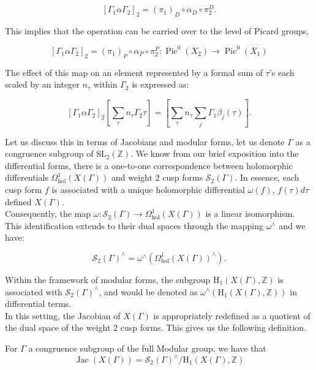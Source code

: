 \[
\left[\Gamma_{1} \alpha \Gamma_{2}\right]_{2} = (\pi_{1})_{D} \circ \alpha_{D} \circ \pi_{2}^{D}.
\]

This implies that the operation can be carried over to the level of Picard groups, 

\[
\left[\Gamma_{1} \alpha \Gamma_{2}\right]_{2} = (\pi_{1})_{P} \circ \alpha_{P} \circ \pi_{2}^{P}: \operatorname{Pic}^{0}(X_{2}) \longrightarrow \operatorname{Pic}^{0}(X_{1})
\]

The effect of this map on an element represented by a formal sum of \( \tau \)'s each scaled by an integer \( n_{\tau} \) within \( \Gamma_{2} \) is expressed as:

\[
\left[\Gamma_{1} \alpha \Gamma_{2}\right]_{2}\left[\sum_{\tau} n_{\tau} \Gamma_{2} \tau\right] = \left[\sum_{\tau} n_{\tau} \sum_{j} \Gamma_{1} \beta_{j}(\tau)\right].
\]

Let us discuss this in terms of Jacobians and modular forms, let us denote \( \Gamma \) as a congruence subgroup of \( \mathrm{SL}_{2}(\mathbb{Z}) \). We know from our brief exposition into the differential forms, there is a one-to-one correspondence between holomorphic differentials \( \Omega_{\mathrm{hol}}^{1}(X(\Gamma)) \) and weight 2 cusp forms \( \mathcal{S}_{2}(\Gamma) \). In essence, each cusp form \( f \) is associated with a unique holomorphic differential \( \omega(f) \), \( f(\tau) d \tau \) defined \( X(\Gamma) \). \\

Consequently, the map \( \omega: \mathcal{S}_{2}(\Gamma) \rightarrow \Omega_{\mathrm{hol}}^{1}(X(\Gamma)) \) is a linear isomorphism. This identification extends to their dual spaces through the mapping \( \omega^{\wedge} \) and we have: 

\[
\mathcal{S}_{2}(\Gamma)^{\wedge} = \omega^{\wedge}(\Omega_{\mathrm{hol}}^{1}(X(\Gamma))^{\wedge}).
\]

Within the framework of modular forms, the subgroup \( \mathrm{H}_{1}(X(\Gamma), \mathbb{Z}) \) is associated with \( \mathcal{S}_{2}(\Gamma)^{\wedge} \), and would be denoted as \( \omega^{\wedge}(\mathrm{H}_{1}(X(\Gamma), \mathbb{Z})) \) in differential terms. \\

In this setting, the Jacobian of \( X(\Gamma) \) is appropriately redefined as a quotient of the dual space of the weight 2 cusp forms. This gives us the following definition.

\begin{definition}
    For $\Gamma$ a congruence subgroup of the full Modular group, we have that 
\[ \operatorname{Jac}(X(\Gamma))=\mathcal{S}_{2}(\Gamma)^{\wedge} / \mathrm{H}_{1}(X(\Gamma), \mathbb{Z}) \]

\end{definition}

